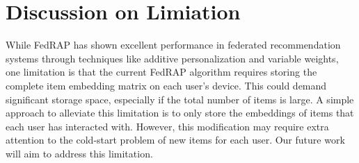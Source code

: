 \documentclass{article} %
\begin{document}
\section{Discussion on Limiation}

While FedRAP has shown excellent performance in federated recommendation systems through techniques like additive personalization and variable weights, one limitation is that the current FedRAP algorithm requires storing the complete item embedding matrix on each user's device. This could demand significant storage space, especially if the total number of items is large. A simple approach to alleviate this limitation is to only store the embeddings of items that each user has interacted with. However, this modification may require extra attention to the cold-start problem of new items for each user. Our future work will aim to address this limitation.
\end{document}
